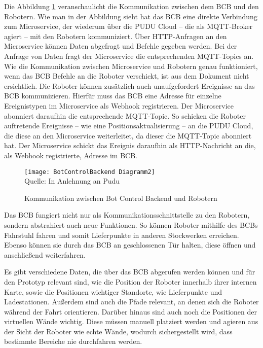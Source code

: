 Die Abbildung \ref{fig:BotControlBackendCommunication} veranschaulicht die Kommunikation zwischen dem \ac{BCB} und den Robotern. Wie man in der Abbildung sieht hat das \ac{BCB} eine direkte Verbindung zum \gls{Microservice}, der wiederum über die PUDU Cloud – die als \gls{MQTT-Broker} agiert – mit den Robotern kommuniziert. Über \gls{HTTP}-Anfragen an den \gls{Microservice} können Daten abgefragt und Befehle gegeben werden. Bei der Anfrage von Daten fragt der \gls{Microservice} die entsprechenden \gls{MQTT}-Topics an. Wie die Kommunikation zwischen \gls{Microservice} und Robotern genau funktioniert, wenn das \ac{BCB} Befehle an die Roboter verschickt, ist aus dem Dokument nicht ersichtlich. Die Roboter können zusätzlich auch unaufgefordert Ereignisse an das \ac{BCB} kommunizieren. Hierfür muss das \ac{BCB} eine Adresse für einzelne Ereignistypen im \gls{Microservice} als \gls{Webhook} registrieren. Der \gls{Microservice} abonniert daraufhin die entsprechende \gls{MQTT-Topic}. So schicken die Roboter auftretende Ereignisse – wie eine Positionsaktualisierung – an die PUDU Cloud, die diese an den \gls{Microservice} weiterleitet, da dieser die \gls{MQTT-Topic} abonniert hat. Der \gls{Microservice} schickt das Ereignis daraufhin als \gls{HTTP}-Nachricht an die, als \gls{Webhook} registrierte, Adresse im \ac{BCB}.

\begin{figure}[H]
    \caption{Kommunikation zwischen Bot Control Backend und Robotern}\label{fig:BotControlBackendCommunication}
    \texttt{[image: BotControlBackend Diagramm2]}
    \\
    Quelle: In Anlehnung an Pudu \cite[S.~4]{PuduSDK}
\end{figure}

Das \ac{BCB} fungiert nicht nur als Kommunikationsschnittstelle zu den Robotern, sondern abstrahiert auch neue Funktionen. So können Roboter mithilfe des \ac{BCB}s Fahrstuhl fahren und somit Lieferpunkte in anderen Stockwerken erreichen. Ebenso können sie durch das \ac{BCB} an geschlossenen Tür halten, diese öffnen und anschließend weiterfahren.

Es gibt verschiedene Daten, die über das \ac{BCB} abgerufen werden können und für den Prototyp relevant sind, wie die Position der Roboter innerhalb ihrer internen Karte, sowie die Positionen wichtiger Standorte, wie Lieferpunkte und Ladestationen. Außerdem sind auch die Pfade relevant, an denen sich die Roboter während der Fahrt orientieren. Darüber hinaus sind auch noch die Positionen der virtuellen Wände wichtig. Diese müssen manuell platziert werden und agieren aus der Sicht der Roboter wie echte Wände, wodurch sichergestellt wird, dass bestimmte Bereiche nie durchfahren werden.


